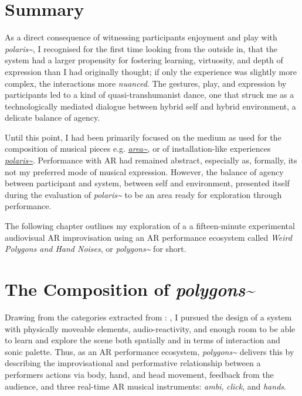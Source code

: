 \clearpage
\section{Summary} \label{sec: polygons-developing}
As a direct consequence of witnessing participants enjoyment and play with \textit{polaris\textasciitilde{}}, I recognised for the first time looking from the outside in, that the system had a larger propensity for fostering learning, virtuosity, and depth of expression than I had originally thought; if only the experience was slightly more complex, the interactions more \textit{nuanced}. The gestures, play, and expression by participants led to a kind of quasi-transhumanist dance, one that struck me as a technologically mediated dialogue between hybrid self and hybrid environment, a delicate balance of agency.



Until this point, I had been primarily focused on the medium as used for the composition of musical pieces e.g. \hyperref[sec: area]{\textit{area\textasciitilde{}}}, or of installation-like experiences \hyperref[sec: polaris]{\textit{polaris\textasciitilde{}}}. Performance with AR had remained abstract, especially as, formally, its not my preferred mode of musical expression. However, the balance of agency between participant and system, between self and environment, presented itself during the evaluation of \textit{polaris\textasciitilde{}} to be an area ready for exploration through performance. 

The following chapter outlines my exploration of a a fifteen-minute experimental audiovisual AR improvisation using an AR performance ecosystem called \textit{Weird Polygons and Hand Noises}, or \textit{polygons\textasciitilde{}} for short.



\section{The Composition of \textit{polygons\textasciitilde{}}} \label{sec: polygons-composition}

Drawing from the categories extracted from : , I pursued the design of a system with physically moveable elements, audio-reactivity, and enough room to be able to learn and explore the scene both spatially and in terms of interaction and sonic palette. Thus, as an AR performance ecosystem, \textit{polygons\textasciitilde{}} delivers this by describing the improvisational and performative relationship between a performers actions via body, hand, and head movement, feedback from the audience, and three real-time AR musical instruments: \textit{ambi}, \textit{click}, and \textit{hands}. 

